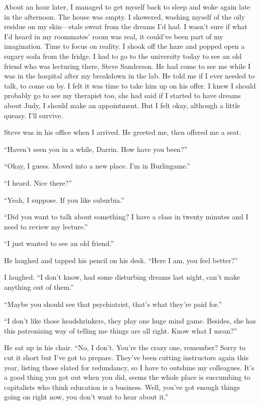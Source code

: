 \documentclass[
]{article}
\begin{document}
About an hour later, I managed to get myself back to sleep and woke
again late in the afternoon. The house was empty. I showered, washing
myself of the oily residue on my skin---stale sweat from the dreams I'd
had. I wasn't sure if what I'd heard in my roommates' room was real, it
could've been part of my imagination. Time to focus on reality. I shook
off the haze and popped open a sugary soda from the fridge. I had to go
to the university today to see an old friend who was lecturing there,
Steve Sanderson. He had come to see me while I was in the hospital after
my breakdown in the lab. He told me if I ever needed to talk, to come on
by. I felt it was time to take him up on his offer. I knew I should
probably go to see my therapist too, she had said if I started to have
dreams about Judy, I should make an appointment. But I felt okay,
although a little queasy. I'll survive.

Steve was in his office when I arrived. He greeted me, then offered me a
seat.

``Haven't seen you in a while, Darrin. How have you been?''

``Okay, I guess. Moved into a new place. I'm in Burlingame.''

``I heard. Nice there?''

``Yeah, I suppose. If you like suburbia.''

``Did you want to talk about something? I have a class in twenty minutes
and I need to review my lecture.''

``I just wanted to see an old friend.''

He laughed and tapped his pencil on his desk. ``Here I am, you feel
better?''

I laughed. ``I don't know, had some disturbing dreams last night, can't
make anything out of them.''

``Maybe you should see that psychiatrist, that's what they're paid
for.''

``I don't like those headshrinkers, they play one huge mind game.
Besides, she has this patronizing way of telling me things are all
right. Know what I mean?''

He sat up in his chair. ``No, I don't. You're the crazy one, remember?
Sorry to cut it short but I've got to prepare. They've been cutting
instructors again this year, listing those slated for redundancy, so I
have to outshine my colleagues. It's a good thing you got out when you
did, seems the whole place is succumbing to capitalists who think
education is a business. Well, you've got enough things going on right
now, you don't want to hear about it.''
\end{document}
